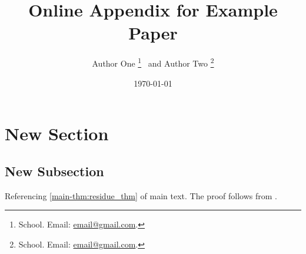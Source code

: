 \documentclass[12pt]{article}
\title{Online Appendix for Example Paper}
\author{
  Author One%
  \thanks{School. Email: \href{mailto:email@gmail.com}{email@gmail.com}.} \ and Author Two%
  \thanks{School. Email: \href{mailto:email@gmail.com}{email@gmail.com}.}
}
\date{\textsc{\today}}
\begin{document}
\maketitle
\appendix
\renewcommand{\thesection}{O\Alph{section}\arabic{section}}
\renewcommand{\thesubsection}{\thesection.\arabic{subsection}}
\renewcommand{\thetheorem}{O\Alph{section}\arabic{theorem}}
\renewcommand{\theproposition}{O\Alph{section}\arabic{proposition}}
\renewcommand{\thelemma}{O\Alph{section}\arabic{lemma}}
\renewcommand{\thecorollary}{O\Alph{section}\arabic{corollary}}
\renewcommand{\thedefinition}{O\Alph{section}\arabic{definition}}
\renewcommand{\theassumption}{O\Alph{section}\arabic{assumption}}
\renewcommand{\theremark}{O\Alph{section}\arabic{remark}}
\renewcommand{\thetable}{O\Alph{section}\arabic{table}}
\renewcommand{\thefigure}{O\Alph{section}\arabic{figure}}
\renewcommand{\theequation}{O\Alph{section}\arabic{equation}}

\section{New Section}
\subsection{New Subsection}

Referencing \autoref{main-thm:residue_thm} of main text. The proof follows from \citet{mas1995microeconomic}.





\newpage

\end{document}
